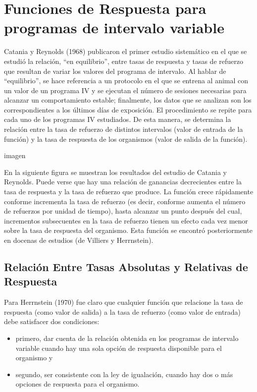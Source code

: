 \documentclass[
  letterpaper,
]{book}
\begin{document}
\section{Funciones de Respuesta para programas de intervalo
variable}\label{funciones-de-respuesta-para-programas-de-intervalo-variable}

Catania y Reynolds (1968) publicaron el primer estudio sistemático en el
que se estudió la relación, ``en equilibrio'', entre tasas de respuesta
y tasas de refuerzo que resultan de variar los valores del programa de
intervalo. Al hablar de ``equilibrio'', se hace referencia a un
protocolo en el que se entrena al animal con un valor de un programa IV
y se ejecutan el número de sesiones necesarias para alcanzar un
comportamiento estable; finalmente, los datos que se analizan son los
correspondientes a los últimos días de exposición. El procedimiento se
repite para cada uno de los programas IV estudiados. De esta manera, se
determina la relación entre la tasa de refuerzo de distintos intervalos
(valor de entrada de la función) y la tasa de respuesta de los
organismos (valor de salida de la función).

imagen

En la siguiente figura se muestran los resultados del estudio de Catania
y Reynolds. Puede verse que hay una relación de ganancias decrecientes
entre la tasa de respuesta y la tasa de refuerzo que produce. La función
crece rápidamente conforme incrementa la tasa de refuerzo (es decir,
conforme aumenta el número de refuerzos por unidad de tiempo), hasta
alcanzar un punto después del cual, incrementos subsecuentes en la tasa
de refuerzo tienen un efecto cada vez menor sobre la tasa de respuesta
del organismo. Esta función se encontró posteriormente en docenas de
estudios (de Villiers y Herrnstein).

\subsection{Relación Entre Tasas Absolutas y Relativas de
Respuesta}\label{relaciuxf3n-entre-tasas-absolutas-y-relativas-de-respuesta}

Para Herrnstein (1970) fue claro que cualquier función que relacione la
tasa de respuesta (como valor de salida) a la tasa de refuerzo (como
valor de entrada) debe satisfacer dos condiciones:

\begin{itemize}
\item
  primero, dar cuenta de la relación obtenida en los programas de
  intervalo variable cuando hay una sola opción de respuesta disponible
  para el organismo y
\item
  segundo, ser consistente con la ley de igualación, cuando hay dos o
  más opciones de respuesta para el organismo.
\end{itemize}
\end{document}
